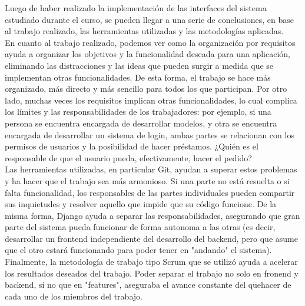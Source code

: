Luego de haber realizado la implementación de las interfaces del sistema estudiado durante el curso, se pueden llegar a una serie de conclusiones, en base al trabajo realizado, las herramientas utilizadas y las metodologías aplicadas.\\
En cuanto al trabajo realizado, podemos ver como la organización por requisitos ayuda a organizar los objetivos y la funcionalidad deseada para una aplicación, eliminando las distracciones y las ideas que pueden surgir a medida que se implementan otras funcionalidades. De esta forma, el trabajo se hace más organizado, más directo y más sencillo para todos los que participan. Por otro lado, muchas veces los requisitos implican otras funcionalidades, lo cual complica los límites y las responsabilidades de los trabajadores: por ejemplo, si una persona se encuentra encargada de desarrollar modelos, y otra se encuentra encargada de desarrollar un sistema de login, ambas partes se relacionan con los permisos de usuarios y la posibilidad de hacer préstamos. ¿Quién es el responsable de que el usuario pueda, efectivamente, hacer el pedido? \\
Las herramientas utilizadas, en particular Git, ayudan a superar estos problemas y ha hacer que el trabajo sea más armonioso. Si una parte no está resuelta o si falta funcionalidad, los responsables de las partes individuales pueden compartir sus inquietudes y resolver aquello que impide que su código funcione. De la misma forma, Django ayuda a separar las responsabilidades, asegurando que gran parte del sistema pueda funcionar de forma autonoma a las otras (es decir, desarrollar un frontend independiente del desarrollo del backend, pero que asume que el otro estará funcionando para poder tener en "andando" el sistema). \\
Finalmente, la metodología de trabajo tipo Scrum que se utilizó ayuda a acelerar los resultados deseados del trabajo. Poder separar el trabajo no solo en fronend y backend, si no que en "features", aseguraba el avance constante del quehacer de cada uno de los miembros del trabajo.